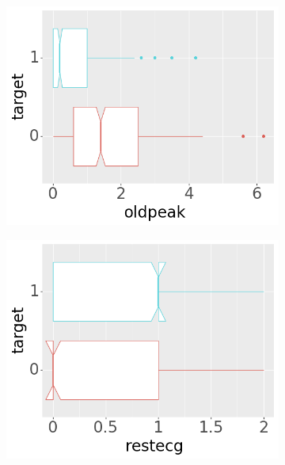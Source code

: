 \begin{figure}[btp]
     \begin{subfigure}[b]{0.32\textwidth}
         \centering
         \includegraphics[width=\textwidth]{plots/target-oldpeak}
     \end{subfigure}
     \begin{subfigure}[b]{0.32\textwidth}
         \centering
         \includegraphics[width=\textwidth]{plots/target-restecg}
     \end{subfigure}
     \begin{subfigure}[b]{0.32\textwidth}
         \centering

\end{subfigure}
\end{figure}
